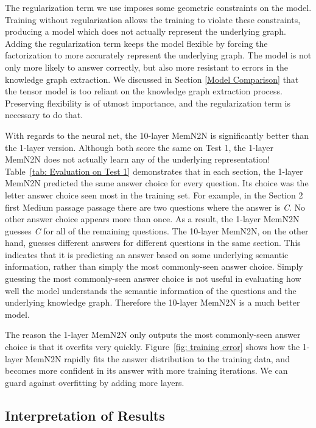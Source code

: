 \documentclass[pageno]{final_paper}
\begin{document}
The regularization term we use imposes some geometric constraints on the model.
Training without regularization allows the training to violate these
constraints, producing a model which does not actually represent the underlying
graph. Adding the regularization term keeps the model flexible by forcing the
factorization to more accurately represent the underlying graph. The model is
not only more likely to answer correctly, but also more resistant to errors in
the knowledge graph extraction. We discussed in Section \ref{Model Comparison}
that the tensor model is too reliant on the knowledge graph extraction process.
Preserving flexibility is of utmost importance, and the regularization term is
necessary to do that.

With regards to the neural net, the 10-layer MemN2N is significantly better than
the 1-layer version. Although both score the same on Test 1, the 1-layer MemN2N
does not actually learn any of the underlying representation! Table~\ref{tab:
Evaluation on Test 1} demonstrates that in each section, the 1-layer MemN2N
predicted the same answer choice for every question. Its choice was the letter
answer choice seen most in the training set. For example, in the Section 2 first
Medium passage passage there are two questions where the answer is \textit{C}.
No other answer choice appears more than once. As a result, the 1-layer MemN2N
guesses \textit{C} for all of the remaining questions. The 10-layer MemN2N, on
the other hand, guesses different answers for different questions in the same
section. This indicates that it is predicting an answer based on some underlying
semantic information, rather than simply the most commonly-seen answer choice.
Simply guessing the most commonly-seen answer choice is not useful in evaluating
how well the model understands the semantic information of the questions and the
underlying knowledge graph. Therefore the 10-layer MemN2N is a much better
model.

The reason the 1-layer MemN2N only outputs the most commonly-seen answer choice
is that it overfits very quickly. Figure~\ref{fig: training error} shows how the
1-layer MemN2N rapidly fits the answer distribution to the training data, and
becomes more confident in its answer with more training iterations. We can guard
against overfitting by adding more layers.

\subsection{Interpretation of Results}
\label{Interpretation of Results}
\end{document}
